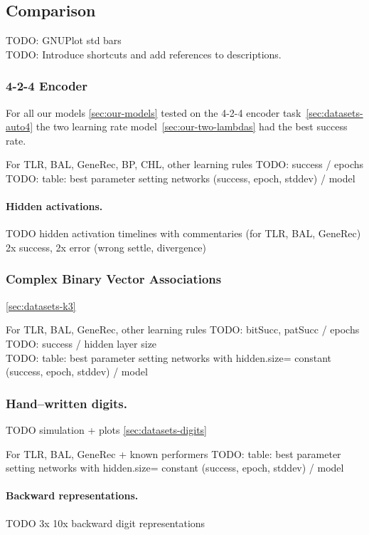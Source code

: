 
\subsection{Comparison} 
\label{sec:results-comparison}

TODO: GNUPlot std bars \\  
TODO: Introduce shortcuts and add references to descriptions. \\

\subsubsection{4-2-4 Encoder}

For all our models \ref{sec:our-models} tested on the 4-2-4 encoder task~\ref{sec:datasets-auto4} the two learning rate model~\ref{sec:our-two-lambdas} had the best success rate. 

For TLR, BAL, GeneRec, BP, CHL, other learning rules
TODO: success / epochs  \\
TODO: table: best parameter setting networks (success, epoch, stddev) / model \\

\paragraph{Hidden activations.} 

TODO hidden activation timelines with commentaries (for TLR, BAL, GeneRec) 
2x success, 2x error (wrong settle, divergence) 

\subsubsection{Complex Binary Vector Associations}
\ref{sec:datasets-k3} 

For TLR, BAL, GeneRec, other learning rules
TODO: bitSucc, patSucc / epochs  \\
TODO: success / hidden layer size  \\
TODO: table: best parameter setting networks with hidden.size= constant (success, epoch, stddev) / model \\

\subsubsection{Hand--written digits.}
TODO simulation + plots \ref{sec:datasets-digits} 

For TLR, BAL, GeneRec + known performers 
TODO: table: best parameter setting networks with hidden.size= constant (success, epoch, stddev) / model \\

\paragraph{Backward representations.} 

TODO 3x 10x backward digit representations 
